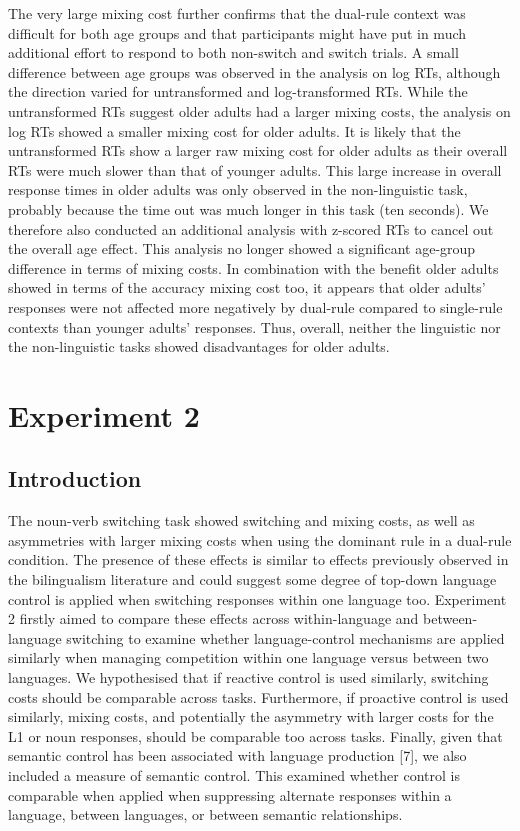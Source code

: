 \documentclass[
]{article}
\begin{document}
The very large mixing cost further confirms that the dual-rule context was difficult for both age groups and that participants might have put in much additional effort to respond to both non-switch and switch trials. A small difference between age groups was observed in the analysis on log RTs, although the direction varied for untransformed and log-transformed RTs. While the untransformed RTs suggest older adults had a larger mixing costs, the analysis on log RTs showed a smaller mixing cost for older adults. It is likely that the untransformed RTs show a larger raw mixing cost for older adults as their overall RTs were much slower than that of younger adults. This large increase in overall response times in older adults was only observed in the non-linguistic task, probably because the time out was much longer in this task (ten seconds). We therefore also conducted an additional analysis with z-scored RTs to cancel out the overall age effect. This analysis no longer showed a significant age-group difference in terms of mixing costs. In combination with the benefit older adults showed in terms of the accuracy mixing cost too, it appears that older adults' responses were not affected more negatively by dual-rule compared to single-rule contexts than younger adults' responses. Thus, overall, neither the linguistic nor the non-linguistic tasks showed disadvantages for older adults.

\hypertarget{experiment-2}{%
\section{Experiment 2}\label{experiment-2}}

\hypertarget{introduction-2}{%
\subsection{Introduction}\label{introduction-2}}

The noun-verb switching task showed switching and mixing costs, as well as asymmetries with larger mixing costs when using the dominant rule in a dual-rule condition. The presence of these effects is similar to effects previously observed in the bilingualism literature and could suggest some degree of top-down language control is applied when switching responses within one language too. Experiment 2 firstly aimed to compare these effects across within-language and between-language switching to examine whether language-control mechanisms are applied similarly when managing competition within one language versus between two languages. We hypothesised that if reactive control is used similarly, switching costs should be comparable across tasks. Furthermore, if proactive control is used similarly, mixing costs, and potentially the asymmetry with larger costs for the L1 or noun responses, should be comparable too across tasks. Finally, given that semantic control has been associated with language production {[}7{]}, we also included a measure of semantic control. This examined whether control is comparable when applied when suppressing alternate responses within a language, between languages, or between semantic relationships.
\end{document}

